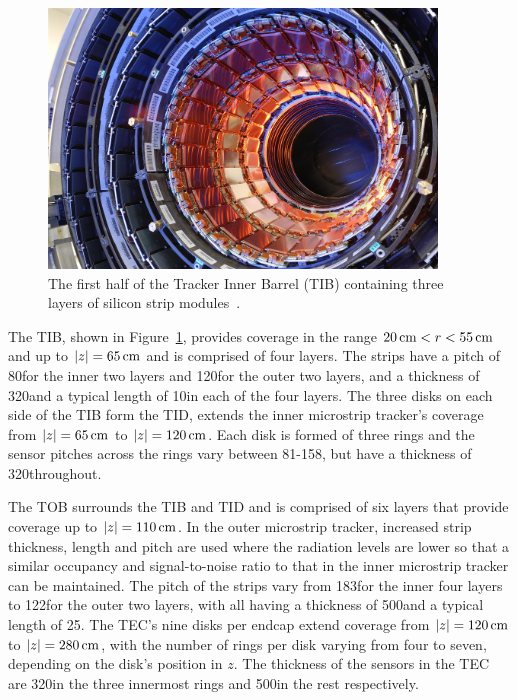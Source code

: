\begin{figure}[htbp]
\begin{center}
\vspace*{3mm}\includegraphics[width=0.92\textwidth]{figs/cms/0610026_01.jpg}
\vspace*{2mm}\caption{The first half of the Tracker Inner Barrel (TIB) containing three layers of silicon strip modules~\cite{Maximilien:995912}.}
\label{fig:TIB}
\end{center}
\end{figure}

The TIB, shown in Figure~\ref{fig:TIB}, provides coverage in the range $20\,\text{cm} < r < 55\,\text{cm}$ and up to $|z| = 65\,\text{cm}$ and is comprised of four layers.
The strips have a pitch of 80\mum for the inner two layers and 120\mum for the outer two layers, and a thickness of 320\mum and a typical length of 10\cm in each of the four layers.
The three disks on each side of the TIB form the TID, extends the inner microstrip tracker's coverage from $|z| = 65\,\text{cm}$ to $|z| = 120\,\text{cm}$.
Each disk is formed of three rings and the sensor pitches across the rings vary between 81-158\mum, but have a thickness of 320\mum throughout.

The TOB surrounds the TIB and TID and is comprised of six layers that provide coverage up to $|z| = 110\,\text{cm}$.
In the outer microstrip tracker, increased strip thickness, length and pitch are used where the radiation levels are lower so that a similar occupancy and signal-to-noise ratio to that in the inner microstrip tracker can be maintained.
The pitch of the strips vary from 183\mum for the inner four layers to 122\mum for the outer two layers, with all having a thickness of 500\mum and a typical length of 25\cm. 
The TEC's nine disks per endcap extend coverage from $|z| = 120\,\text{cm}$ to $|z| = 280\,\text{cm}$, with the number of rings per disk varying from four to seven, depending on the disk's position in $z$.
The thickness of the sensors in the TEC are 320\mum in the three innermost rings and 500\mum in the rest respectively.

